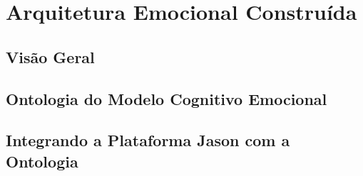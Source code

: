\chapter{Arquitetura Emocional Constru\'ida} \label{ch:aec}


\section{Visão Geral}
\section{Ontologia do Modelo Cognitivo Emocional} %
\section{Integrando a Plataforma Jason com a Ontologia}
